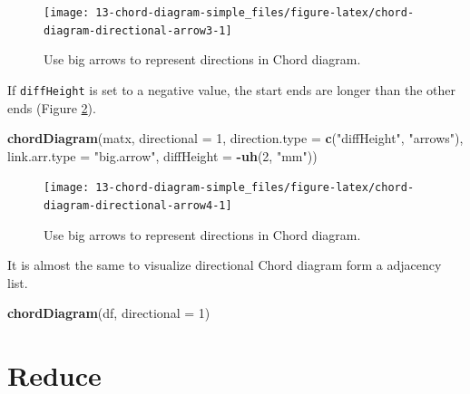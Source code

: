 \documentclass[]{book}
\newenvironment{Shaded}{\begin{snugshade}}{\end{snugshade}}
\newcommand{\KeywordTok}[1]{\textcolor[rgb]{0.13,0.29,0.53}{\textbf{#1}}}
\newcommand{\DataTypeTok}[1]{\textcolor[rgb]{0.13,0.29,0.53}{#1}}
\newcommand{\DecValTok}[1]{\textcolor[rgb]{0.00,0.00,0.81}{#1}}
\newcommand{\StringTok}[1]{\textcolor[rgb]{0.31,0.60,0.02}{#1}}
\newcommand{\OperatorTok}[1]{\textcolor[rgb]{0.81,0.36,0.00}{\textbf{#1}}}
\newcommand{\NormalTok}[1]{#1}
\theoremstyle{definition}
\theoremstyle{definition}
\theoremstyle{remark}
\begin{document}
\begin{figure}

{\centering \texttt{[image: 13-chord-diagram-simple\_files/figure-latex/chord-diagram-directional-arrow3-1]} 

}

\caption{Use big arrows to represent directions in Chord diagram.}\label{fig:chord-diagram-directional-arrow3}
\end{figure}

If \texttt{diffHeight} is set to a negative value, the start ends are
longer than the other ends (Figure
\ref{fig:chord-diagram-directional-arrow4}).

\begin{Shaded}
\begin{Highlighting}[]
\KeywordTok{chordDiagram}\NormalTok{(matx, }\DataTypeTok{directional =} \DecValTok{1}\NormalTok{, }\DataTypeTok{direction.type =} \KeywordTok{c}\NormalTok{(}\StringTok{"diffHeight"}\NormalTok{, }\StringTok{"arrows"}\NormalTok{),}
    \DataTypeTok{link.arr.type =} \StringTok{"big.arrow"}\NormalTok{, }\DataTypeTok{diffHeight =} \OperatorTok{-}\KeywordTok{uh}\NormalTok{(}\DecValTok{2}\NormalTok{, }\StringTok{"mm"}\NormalTok{))}
\end{Highlighting}
\end{Shaded}

\begin{figure}

{\centering \texttt{[image: 13-chord-diagram-simple\_files/figure-latex/chord-diagram-directional-arrow4-1]} 

}

\caption{Use big arrows to represent directions in Chord diagram.}\label{fig:chord-diagram-directional-arrow4}
\end{figure}

It is almost the same to visualize directional Chord diagram form a
adjacency list.

\begin{Shaded}
\begin{Highlighting}[]
\KeywordTok{chordDiagram}\NormalTok{(df, }\DataTypeTok{directional =} \DecValTok{1}\NormalTok{)}
\end{Highlighting}
\end{Shaded}

\section{Reduce}\label{reduce}
\end{document}
